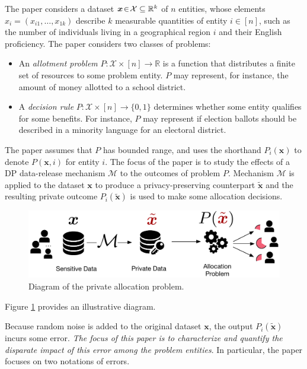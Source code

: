 \documentclass[9pt,lineno,twocolumn,twoside]{pnas-new}
\newcommand{\cM}{\mathcal{M}}
\newcommand{\cX}{\mathcal{X}}
\begin{document}
    The paper considers a dataset $\bm{x} \!\in\! \cX \subseteq \RR^k$ of $n$ entities,
    whose elements $x_i= (x_{i1},\ldots, x_{1k})$ describe $k$ measurable
    quantities of entity $i \!\in\! [n]$, such as the number of individuals living
    in a geographical region $i$ and their English proficiency.
    The paper considers two classes of problems:
    \begin{itemize}[leftmargin=*,labelsep=2pt,itemsep=0pt,parsep=2pt,topsep=2pt]
        \item An \emph{allotment problem} $P : \cX \times [n] \to \mathbb{R}$ is a function that distributes a finite set of resources to some problem entity. $P$ may represent, for instance, the amount of money allotted to a school district.
        \item A \emph{decision rule} $P: \cX \times [n] \to \{0,1\}$
        determines whether some entity qualifies for some benefits. For
        instance, $P$ may represent if election ballots should be described
        in a minority language for an electoral district.
    \end{itemize}
    The paper assumes that $P$ has bounded range, and uses the shorthand
    $P_i(\bm{x})$ to denote $P(\bm{x}, i)$ for entity $i$.
%
    The focus of the paper is to study the effects of a DP data-release
    mechanism $\cM$ to the outcomes of problem $P$. Mechanism $\cM$ is
    applied to the dataset $\bm{x}$ to produce a privacy-preserving
    counterpart $\tilde{\bm{x}}$ and the resulting private outcome
    $P_i(\tilde{\bm{x}})$ is used to make some allocation decisions.

    \begin{figure}[!t]
        \centering
        \includegraphics[width=0.9\columnwidth]{images/figure.pdf}
        \caption{Diagram of the private allocation problem.}
        \label{fig:framework}
    \end{figure}
    Figure \ref{fig:framework} provides an illustrative diagram.

    Because random noise is added to the original dataset $\bm{x}$, the output $P_i(\tilde{\bm{x}})$ incurs some error. {\em The focus of this paper is to characterize and quantify the disparate impact of this error among the problem entities}. In particular, the paper focuses on two notations of errors.
\end{document}
